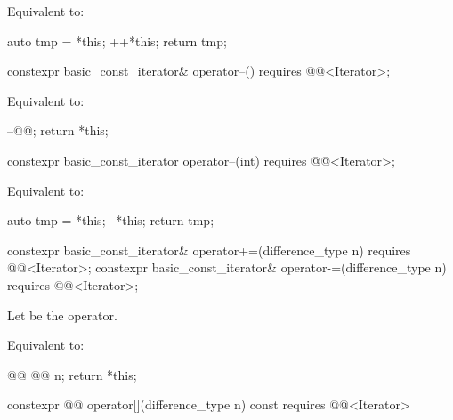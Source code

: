 \begin{itemdescr}
\pnum
\effects
Equivalent to:
\begin{codeblock}
auto tmp = *this;
++*this;
return tmp;
\end{codeblock}
\end{itemdescr}

%
\begin{itemdecl}
constexpr basic_const_iterator& operator--() requires @@<Iterator>;
\end{itemdecl}

\begin{itemdescr}
\pnum
\effects
Equivalent to:
\begin{codeblock}
--@@;
return *this;
\end{codeblock}
\end{itemdescr}

%
\begin{itemdecl}
constexpr basic_const_iterator operator--(int) requires @@<Iterator>;
\end{itemdecl}

\begin{itemdescr}
\pnum
\effects
Equivalent to:
\begin{codeblock}
auto tmp = *this;
--*this;
return tmp;
\end{codeblock}
\end{itemdescr}

%
%
\begin{itemdecl}
constexpr basic_const_iterator& operator+=(difference_type n)
  requires @@<Iterator>;
constexpr basic_const_iterator& operator-=(difference_type n)
  requires @@<Iterator>;
\end{itemdecl}

\begin{itemdescr}
\pnum
Let  be the operator.

\pnum
\effects
Equivalent to:
\begin{codeblock}
@@ @@ n;
return *this;
\end{codeblock}
\end{itemdescr}

%
\begin{itemdecl}
constexpr @@ operator[](difference_type n) const requires @@<Iterator>
\end{itemdecl}


